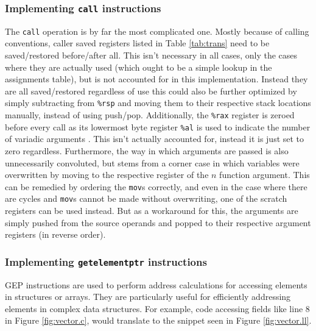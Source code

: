 \documentclass{article}
\begin{document}


\subsubsection{Implementing \texttt{call} instructions} \label{impl-call}

The \texttt{call} operation is by far the most complicated one. Mostly because of calling conventions, caller saved registers listed in Table \ref{tab:trans} need to be saved/restored before/after all. This isn't necessary in all cases, only the cases where they are actually used (which ought to be a simple lookup in the assignments table), but is not accounted for in this implementation. Instead they are all saved/restored regardless of use this could also be further optimized by simply subtracting from \texttt{\%rsp} and moving them to their respective stack locations manually,  instead of using push/pop.
Additionally, the \texttt{\%rax} register is zeroed before every call as its lowermost byte register \texttt{\%al} is used to indicate the number of variadic arguments \cite[25]{sysv}. This isn't actually accounted for, instead it is just set to zero regardless.
Furthermore, the way in which arguments are passed is also unnecessarily convoluted, but stems from a corner case in which variables were overwritten by moving to the respective register of the \(n\) function argument. This can be remedied by ordering the \texttt{mov}s correctly, and even in the case where there are cycles and \texttt{mov}s cannot be made without overwriting, one of the scratch registers can be used instead. But as a workaround for this, the arguments are simply pushed from the source operands and popped to their respective argument registers (in reverse order).

\subsubsection{Implementing \texttt{getelementptr} instructions}\label{impl-gep}
GEP instructions are used to perform address calculations for accessing elements in  structures or arrays. They are particularly useful for efficiently addressing elements in complex data structures. For example, code accessing fields like line 8 in Figure \ref{fig:vector.c}, would  translate to the snippet seen in Figure \ref{fig:vector.ll}.
\end{document}
